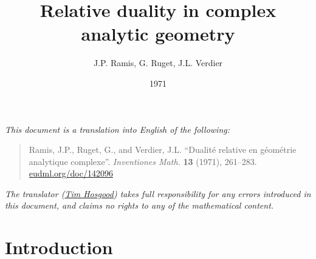 \documentclass[british]{article}
\title{Relative duality in complex analytic geometry}
\author{J.P. Ramis, G. Ruget, J.L. Verdier}
\date{1971}
\newcommand{\oldpage}[1]{\marginpar{\footnotesize$\Big\vert$ \textit{p.~#1}}}
\begin{document}
\maketitle
\thispagestyle{fancy}

\setcounter{footnote}{0}



\emph{This document is a translation into English of the following:}

\begin{quote}
Ramis, J.P., Ruget, G., and Verdier, J.L. ``Dualité relative en
géométrie analytique complexe''. \emph{Inventiones Math.} \textbf{13}
(1971), 261--283.
\href{https://eudml.org/doc/142096}{eudml.org/doc/142096}
\end{quote}

\emph{The translator (\href{https://thosgood.net}{Tim Hosgood}) takes
full responsibility for any errors introduced in this document, and
claims no rights to any of the mathematical content.}

\tableofcontents

\providecommand{\scr}[1]{{\mathscr{#1}}}
\renewcommand{\cal}[1]{{\mathcal{#1}}}
\renewcommand{\frak}[1]{{\mathfrak{#1}}}
\renewcommand{\geq}{\geqslant}
\renewcommand{\leq}{\leqslant}

\providecommand{\sh}[1]{\scr{#1}}

\providecommand{\OO}{\sh{O}}
\providecommand{\HH}{\mathrm{H}}
\providecommand{\cc}{\mathrm{c}}
\providecommand{\coh}{\mathrm{coh}}
\providecommand{\CC}{\mathrm{C}}
\providecommand{\RR}{\mathrm{R}}
\providecommand{\LL}{\mathrm{L}}
\providecommand{\TT}{\mathbf{T}}
\providecommand{\KK}{\mathbf{K}}
\providecommand{\DD}{\mathrm{D}}

\providecommand{\Hom}{\operatorname{Hom}}
\providecommand{\Ext}{\operatorname{Ext}}
\providecommand{\shExt}{\mathscr{E}\mathcal{xt}}
\providecommand{\Supp}{\operatorname{Supp}}

\section*{Introduction}\label{introduction}

\oldpage{261}
\end{document}
